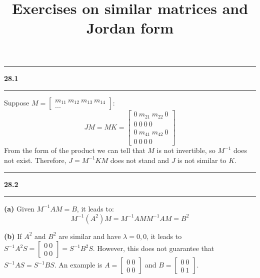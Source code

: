 \documentclass[11pt]{article}
\newcommand\question[2]{\vspace{.25in}\hrule\textbf{#1 #2}\vspace{.5em}\hrule\vspace{.10in}}
\renewcommand\part[1]{\vspace{.10in}\textbf{(#1)}}
\begin{document}
\raggedright
\newcommand\NAME{Haiying Cui}  %
\newcommand\ANDREWID{Christy}     %
\newcommand\HWNUM{28}              %

\title{Exercises on similar matrices and Jordan form}
\maketitle

\question{28.1}{}
Suppose \(M = \begin{bmatrix} m_{11} \ m_{12} \ m_{13} \ m_{14} \\ ... \end{bmatrix}\):
$$JM = MK = \begin{bmatrix} 0 \ m_{21} \ m_{22} \ 0 \\ 0 \ 0 \ 0 \ 0 \\ 0 \ m_{41} \ m_{42} \ 0 \\ 0 \ 0 \ 0 \ 0 \end{bmatrix}$$
From the form of the product we can tell that \(M\) is not invertible, so \(M^{-1}\) does not exist. Therefore, \(J = M^{-1}KM\) does not stand and \(J\) is not similar to \(K\).

\question{28.2}{}
\part{a} Given \(M^{-1}AM = B\), it leads to:
$$M^{-1}(A^2)M = M^{-1}AMM^{-1}AM = B^2$$ 

\part{b} If \(A^2\) and \(B^2\) are similar and have \(\lambda = 0, 0\), it leads to \(S^{-1}A^2S = \begin{bmatrix} 0 \ 0 \\ 0 \ 0 \end{bmatrix} = S^{-1}B^2S\). However, this does not guarantee that \(S^{-1}AS = S^{-1}BS\). An example is \(A = \begin{bmatrix} 0 \ 0 \\ 0 \ 0 \end{bmatrix}\) and \(B = \begin{bmatrix} 0 \ 0 \\ 0 \ 1 \end{bmatrix}\).
\end{document}
